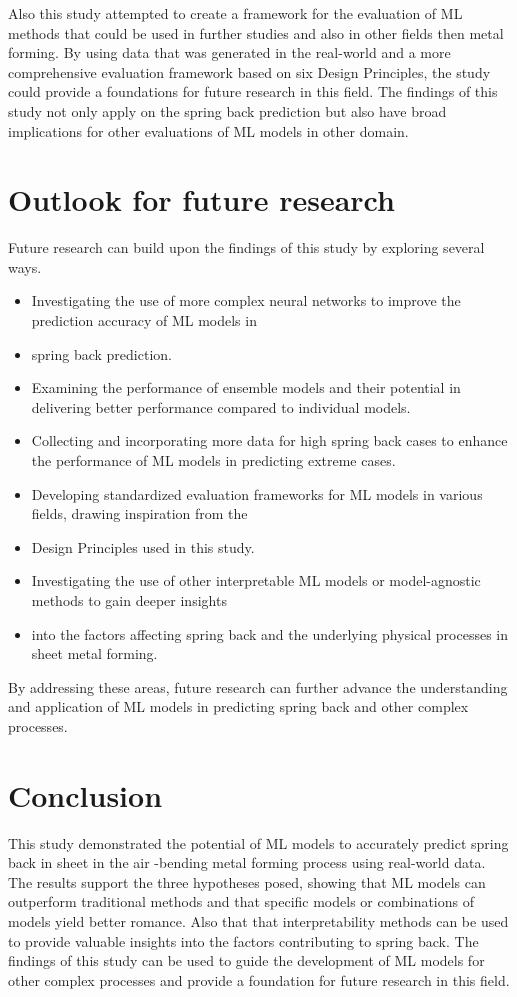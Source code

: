 Also this study attempted to create a framework for the evaluation of ML methods that could be used in further
studies and also in other fields then metal forming.
By using data that was generated in the real-world and a more comprehensive evaluation framework based on six Design
Principles, the study could provide a foundations for future research in this field.
The findings of this study not only apply on the spring back prediction but also have broad implications for other
evaluations of ML models in other domain.


\section{Outlook for future research}\label{sec:outlook-for-future-research}


Future research can build upon the findings of this study by exploring several ways.

\begin{itemize}
    \item Investigating the use of more complex neural networks to improve the prediction accuracy of ML models in
    \item spring back
    prediction.
    \item Examining the performance of ensemble models and their potential in delivering better performance compared to
    individual models.
    \item Collecting and incorporating more data for high spring back cases to enhance the performance of ML models in
    predicting extreme cases.
    \item Developing standardized evaluation frameworks for ML models in various fields, drawing inspiration from the
    \item Design
    Principles used in this study.
    \item Investigating the use of other interpretable ML models or model-agnostic methods to gain deeper insights
    \item into the
    factors affecting spring back and the underlying physical processes in sheet metal forming.
\end{itemize}

By addressing these areas, future research can further advance the understanding and application of ML models in
predicting spring back and other complex processes.


\section{Conclusion}\label{sec:conclusion}
This study demonstrated the potential of \ac{ML} models to accurately predict spring back in sheet in the air
-bending metal forming process using real-world data.
The results support the three hypotheses posed, showing that \ac{ML} models can outperform traditional methods and
that specific models or combinations of models yield better romance.
Also that that interpretability methods can be used to provide valuable insights into the factors contributing to
spring back.
The findings of this study can be used to guide the development of \ac{ML} models for other complex processes and
provide a foundation for future research in this field.
